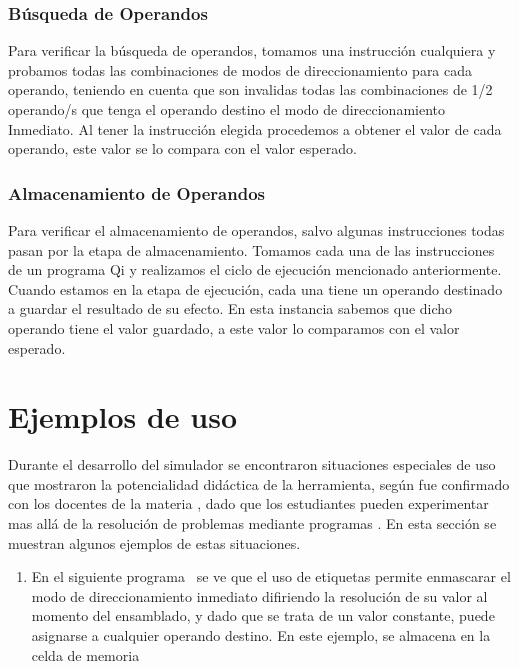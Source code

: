 \begin{enumerate}
\subsubsection{Búsqueda de Operandos}

Para verificar la búsqueda de operandos, tomamos una instrucción cualquiera y probamos todas las combinaciones de modos de direccionamiento para cada operando, teniendo en cuenta que son invalidas todas las combinaciones de 1/2 operando/s que tenga el operando destino el modo de direccionamiento Inmediato. Al tener la instrucción elegida procedemos a obtener el valor de cada operando, este valor se lo compara con el valor esperado. 
 
\subsubsection{Almacenamiento de Operandos}

Para verificar el almacenamiento de operandos, salvo algunas instrucciones todas pasan por la etapa de almacenamiento.
Tomamos cada una de las instrucciones de un programa Qi y realizamos el ciclo de ejecución mencionado anteriormente.
Cuando estamos en la etapa de ejecución, cada una tiene un operando destinado a guardar el resultado de su efecto.
En esta instancia sabemos que  dicho operando tiene el valor guardado, a este valor lo comparamos con el valor esperado.

\section{Ejemplos de uso}

Durante el desarrollo del simulador se encontraron situaciones especiales de uso que mostraron la potencialidad didáctica de la herramienta, según fue confirmado con los docentes de la materia \orga, dado que los estudiantes pueden experimentar mas allá de la resolución de problemas mediante programas \qi. En esta sección se muestran algunos ejemplos de estas situaciones.

\begin{enumerate}

\item En el siguiente programa \qi\ se ve que el uso de etiquetas permite enmascarar el modo de direccionamiento inmediato difiriendo la resolución de su valor al momento del ensamblado, y dado que se trata de un valor constante, puede asignarse a cualquier operando destino. En este ejemplo, se almacena en la celda de memoria 


\end{enumerate}
\end{enumerate}
